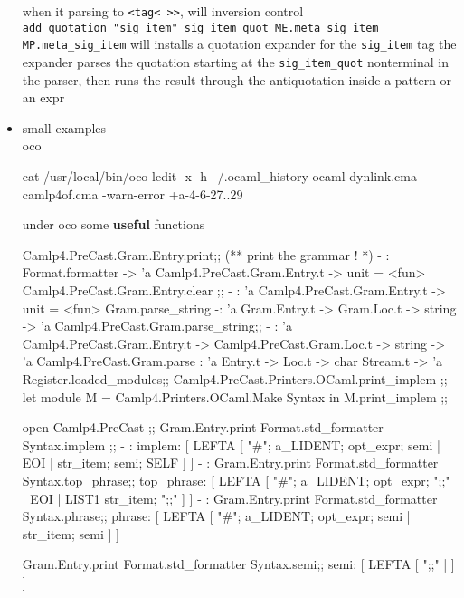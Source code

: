 \begin{itemize}
\begin{ocamlcode}
\end{ocamlcode}


  when it parsing to \verb|<tag< >>|, will inversion control \\
   \verb|add_quotation "sig_item" sig_item_quot ME.meta_sig_item MP.meta_sig_item|
   will  installs a quotation expander for the \verb|sig_item| tag
   the expander parses the quotation starting at the \verb|sig_item_quot|
   nonterminal in the parser, then runs the result through the antiquotation
   inside a pattern or an expr 

 \item small examples \\
   {\color{red} oco}
   

\begin{ocamlcode}
cat /usr/local/bin/oco
ledit -x -h ~/.ocaml_history ocaml dynlink.cma camlp4of.cma -warn-error +a-4-6-27..29
\end{ocamlcode}


   under oco some \textbf{useful} functions


\begin{ocamlcode}
Camlp4.PreCast.Gram.Entry.print;; (** print the grammar ! *)
- : Format.formatter -> 'a Camlp4.PreCast.Gram.Entry.t -> unit = <fun>
Camlp4.PreCast.Gram.Entry.clear ;;
- : 'a Camlp4.PreCast.Gram.Entry.t -> unit = <fun>
Gram.parse_string
-: 'a Gram.Entry.t -> Gram.Loc.t -> string -> 'a 
Camlp4.PreCast.Gram.parse_string;;
- : 'a Camlp4.PreCast.Gram.Entry.t ->
    Camlp4.PreCast.Gram.Loc.t -> string -> 'a
Camlp4.PreCast.Gram.parse : 'a Entry.t -> Loc.t -> char Stream.t -> 'a
Register.loaded_modules;;
Camlp4.PreCast.Printers.OCaml.print_implem ;;
let module M = Camlp4.Printers.OCaml.Make Syntax in M.print_implem ;;
\end{ocamlcode}


   

\begin{ocamlcode}
open Camlp4.PreCast ;;
Gram.Entry.print Format.std_formatter Syntax.implem ;;
- : 
implem: [ LEFTA
  [ "#"; a_LIDENT; opt_expr; semi
  | EOI
  | str_item; semi; SELF ] ]
- : 
Gram.Entry.print Format.std_formatter Syntax.top_phrase;;
top_phrase: [ LEFTA
  [ "#"; a_LIDENT; opt_expr; ";;"
  | EOI
  | LIST1 str_item; ";;" ] ]
- : 
Gram.Entry.print Format.std_formatter Syntax.phrase;;
phrase: [ LEFTA
  [ "#"; a_LIDENT; opt_expr; semi
  | str_item; semi ] ]

Gram.Entry.print Format.std_formatter Syntax.semi;;
semi: [ LEFTA
  [ ";;"
  |  ] ]


\end{ocamlcode}
\end{itemize}
